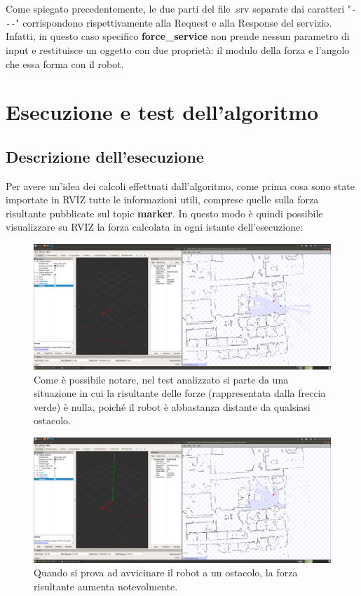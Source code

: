 \documentclass[Lau, binding=0.6cm, oneside]{sapthesis}
\begin{document}
Come spiegato precedentemente, le due parti del file .srv separate dai caratteri "\lstinline{---}" corrispondono rispettivamente alla Request e alla Response del servizio.
Infatti, in questo caso specifico \textbf{force\_service} non prende nessun parametro di input e restituisce un oggetto con due proprietà: il modulo della forza e l'angolo che essa forma con il robot.

\chapter{Esecuzione e test dell'algoritmo}
\section{Descrizione dell'esecuzione}
Per avere un'idea dei calcoli effettuati dall'algoritmo, come prima cosa sono state importate in RVIZ tutte le informazioni utili, comprese quelle sulla forza risultante pubblicate sul topic \textbf{marker}.
In questo modo è quindi possibile visualizzare su RVIZ la forza calcolata in ogni istante dell'esecuzione:
\begin{figure}[htp]
    \centering
    \includegraphics[width=13.5cm]{rviz_force1.png}
    \caption{Come è possibile notare, nel test analizzato si parte da una situazione in cui la risultante delle forze (rappresentata dalla freccia verde) è nulla, poiché il robot è abbastanza distante da qualsiasi ostacolo.}
    \label{fig:rviz_force1}
\end{figure}
\begin{figure}[htp]
    \centering
    \includegraphics[width=13.5cm]{rviz_force2.png}
    \caption{Quando si prova ad avvicinare il robot a un ostacolo, la forza risultante aumenta notevolmente.}
    \label{fig:rviz_force2}
\end{figure}
\end{document}
